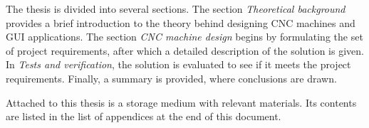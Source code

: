 The thesis is divided into several sections. The section \textit{Theoretical
background} provides a brief introduction to the theory behind designing CNC
machines and GUI applications. The section \textit{CNC machine design}
begins by formulating the set of project requirements, after which a detailed
description of the solution is given. In \textit{Tests and verification}, the
solution is evaluated to see if it meets the project requirements. Finally, a
summary is provided, where conclusions are drawn.

Attached to this thesis is a storage medium with relevant materials. Its
contents are listed in the list of appendices at the end of this document.
